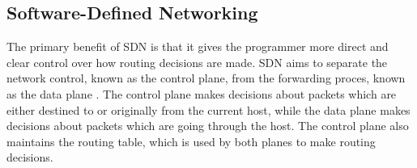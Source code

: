 \subsection{Software-Defined Networking}
\label{software_defined_networking}



The primary benefit of SDN is that it gives the programmer more direct and clear control over how routing decisions are made. SDN aims to separate the network control, known as the control plane, from the forwarding proces, known as the data plane \cite{software_defined_networking_survey}. The control plane makes decisions about packets which are either destined to or originally from the current host, while the data plane makes decisions about packets which are going through the host. The control plane also maintains the routing table, which is used by both planes to make routing decisions.
